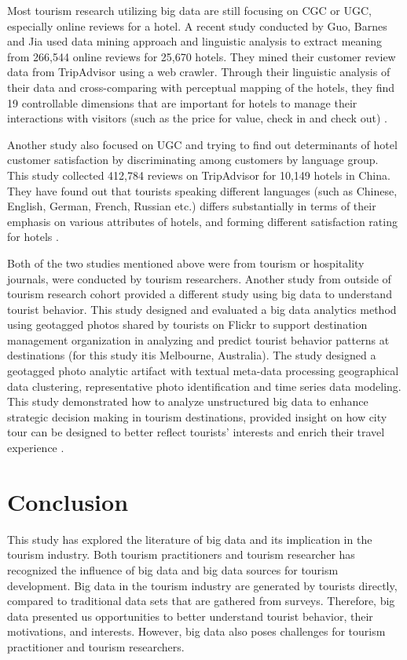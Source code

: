 \documentclass[sigconf]{acmart}
\begin{document}
Most tourism research utilizing big data are still focusing on CGC or UGC, especially
online reviews for a hotel. A recent study conducted by Guo, Barnes and Jia used data
mining approach and linguistic analysis to extract meaning from 266,544 online reviews
for 25,670 hotels. They mined their customer review data from TripAdvisor using a web
crawler. Through their linguistic analysis of their data and cross-comparing with
perceptual mapping of the hotels, they find 19 controllable dimensions that are
important for hotels to manage their interactions with visitors (such as the price for
value, check in and check out) \cite{GUO2017467}.

Another study also focused on UGC and trying to find out determinants of hotel
customer satisfaction by discriminating among customers by language group. This study
collected 412,784 reviews on TripAdvisor for 10,149 hotels in China. They have found
out that tourists speaking different languages (such as Chinese, English, German,
French, Russian etc.) differs substantially in terms of their emphasis on various
attributes of hotels, and forming different satisfaction rating for hotels
\cite{LIU2017554}.

Both of the two studies mentioned above were from tourism or hospitality journals,
were conducted by tourism researchers. Another study from outside of tourism research
cohort provided a different study using big data to understand tourist behavior. This
study designed and evaluated a big data analytics method using geotagged photos shared
by tourists on Flickr to support destination management organization in analyzing and
predict tourist behavior patterns at destinations (for this study itis Melbourne,
Australia). The study designed a geotagged photo analytic artifact with textual
meta-data processing geographical data clustering, representative photo identification
and time series data modeling. This study demonstrated how to analyze unstructured big
data to enhance strategic decision making in tourism destinations, provided insight on
how city tour can be designed to better reflect tourists' interests and enrich their
travel experience \cite{MIAH2017}. 


\section{Conclusion}
This study has explored the literature of big data and its implication in the tourism
industry. Both tourism practitioners and tourism researcher has recognized the
influence of big data and big data sources for tourism development. Big data in the
tourism industry are generated by tourists directly, compared to traditional data sets
that are gathered from surveys. Therefore, big data presented us opportunities to
better understand tourist behavior, their motivations, and interests. However, big
data also poses challenges for tourism practitioner and tourism researchers. 
\end{document}
